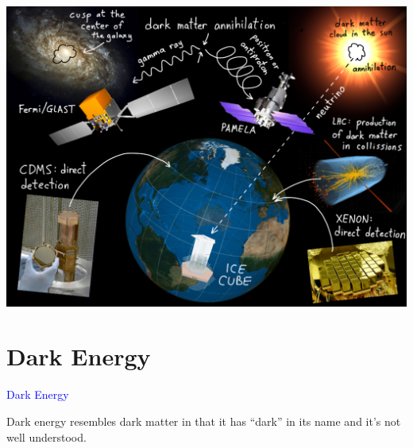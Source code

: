 \documentclass[compress]{beamer}
\begin{document}
\begingroup
{}
\begin{frame}

\mbox{\hspace{-1 cm} \includegraphics[width=1.17\linewidth]{pictures/experiments.png}}

\end{frame}
\endgroup


\section*{Dark Energy}
\begin{frame}
\begin{center}
\Huge \textcolor{blue}{Dark Energy}
\end{center}
\end{frame}

\begin{frame}
\begin{center}
\begin{minipage}{0.75\linewidth}
\vspace{0.5 cm}
Dark energy resembles dark matter in that it has ``dark'' in its name
and it's not well understood.

\vspace{0.5 cm}

\vspace{0.5 cm}
\end{minipage}
\end{center}
\end{frame}
\end{document}
